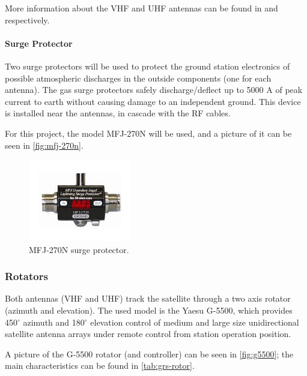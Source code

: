 More information about the VHF and UHF antennas can be found in \cite{2mcp14} and \cite{a719b} respectively.

\paragraph{Surge Protector}

Two surge protectors will be used to protect the ground station electronics of possible atmospheric discharges in the outside components (one for each antenna). The gas surge protectors safely discharge/deflect up to 5000 A of peak current to earth without causing damage to an independent ground. This device is installed near the antennas, in cascade with the RF cables.

For this project, the model MFJ-270N will be used, and a picture of it can be seen in \autoref{fig:mfj-270n}.

\begin{figure}[!ht]
    \begin{center}
        \includegraphics[width=0.4\textwidth]{figures/mfj-270n.jpeg}
        \caption{MFJ-270N surge protector.}
        \label{fig:mfj-270n}
    \end{center}
\end{figure}

\subsubsection{Rotators}

Both antennas (VHF and UHF) track the satellite through a two axis rotator (azimuth and elevation). The used model is the Yaesu G-5500, which provides 450$^{\circ}$ azimuth and 180$^{\circ}$ elevation control of medium and large size unidirectional satellite antenna arrays under remote control from station operation position.

A picture of the G-5500 rotator (and controller) can be seen in \autoref{fig:g5500}; the main characteristics can be found in \autoref{tab:grs-rotor}.

